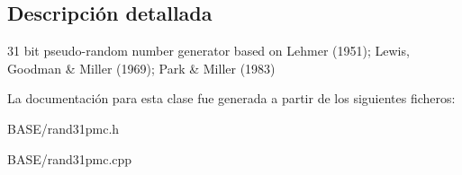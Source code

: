 \subsection{Descripción detallada}
31 bit pseudo-\/random number generator based on Lehmer (1951); Lewis, Goodman \& Miller (1969); Park \& Miller (1983) 

La documentación para esta clase fue generada a partir de los siguientes ficheros\+:\begin{DoxyCompactItemize}
\item 
B\+A\+S\+E/rand31pmc.\+h\item 
B\+A\+S\+E/rand31pmc.\+cpp\end{DoxyCompactItemize}
